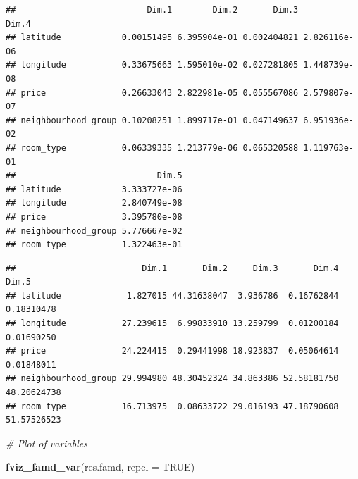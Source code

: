 \documentclass[
]{article}
\newenvironment{Shaded}{\begin{snugshade}}{\end{snugshade}}
\newcommand{\CommentTok}[1]{\textcolor[rgb]{0.56,0.35,0.01}{\textit{#1}}}
\newcommand{\DataTypeTok}[1]{\textcolor[rgb]{0.13,0.29,0.53}{#1}}
\newcommand{\KeywordTok}[1]{\textcolor[rgb]{0.13,0.29,0.53}{\textbf{#1}}}
\newcommand{\NormalTok}[1]{#1}
\newcommand{\OperatorTok}[1]{\textcolor[rgb]{0.81,0.36,0.00}{\textbf{#1}}}
\newcommand{\OtherTok}[1]{\textcolor[rgb]{0.56,0.35,0.01}{#1}}
\begin{document}
\begin{Shaded}
\end{Shaded}

\begin{verbatim}
##                          Dim.1        Dim.2       Dim.3        Dim.4
## latitude            0.00151495 6.395904e-01 0.002404821 2.826116e-06
## longitude           0.33675663 1.595010e-02 0.027281805 1.448739e-08
## price               0.26633043 2.822981e-05 0.055567086 2.579807e-07
## neighbourhood_group 0.10208251 1.899717e-01 0.047149637 6.951936e-02
## room_type           0.06339335 1.213779e-06 0.065320588 1.119763e-01
##                            Dim.5
## latitude            3.333727e-06
## longitude           2.840749e-08
## price               3.395780e-08
## neighbourhood_group 5.776667e-02
## room_type           1.322463e-01
\end{verbatim}

\begin{Shaded}
\end{Shaded}

\begin{verbatim}
##                         Dim.1       Dim.2     Dim.3       Dim.4       Dim.5
## latitude             1.827015 44.31638047  3.936786  0.16762844  0.18310478
## longitude           27.239615  6.99833910 13.259799  0.01200184  0.01690250
## price               24.224415  0.29441998 18.923837  0.05064614  0.01848011
## neighbourhood_group 29.994980 48.30452324 34.863386 52.58181750 48.20624738
## room_type           16.713975  0.08633722 29.016193 47.18790608 51.57526523
\end{verbatim}

\begin{Shaded}
\begin{Highlighting}[]
\CommentTok{# Plot of variables}

\KeywordTok{fviz_famd_var}\NormalTok{(res.famd, }\DataTypeTok{repel =} \OtherTok{TRUE}\NormalTok{)}
\end{Highlighting}
\end{Shaded}
\end{document}
